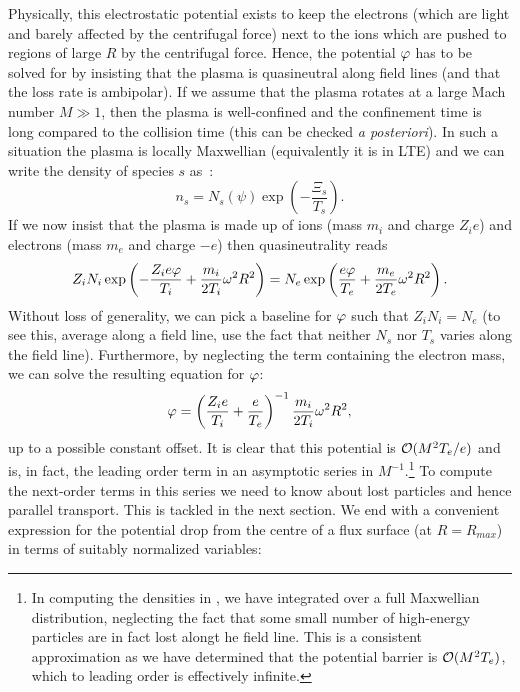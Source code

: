 \documentclass{revtex4}
\begin{document}
Physically, this electrostatic potential exists to keep the electrons (which are light and barely affected by the centrifugal force) next to the ions which are pushed to regions of large $R$ by the centrifugal force.
Hence, the potential $\varphi$ has to be solved for by insisting that the plasma is quasineutral along field lines (and that the loss rate is ambipolar).
If we assume that the plasma rotates at a large Mach number $M \gg 1$, then the plasma is well-confined and the confinement time is long compared to the collision time (this can be checked \textit{a posteriori}). In such a situation the plasma is locally Maxwellian (equivalently it is in LTE) and we can write the density of species $s$ as~\cite{catto:2784,flowtome1}:
\begin{equation}
n_s = N_s(\psi) \exp\left( - \frac{\Xi_s}{T_s} \right).
\label{confinedDensity}
\end{equation}
If we now insist that the plasma is made up of ions (mass $m_i$ and charge $Z_i e$) and electrons (mass $m_e$ and charge $-e$) then quasineutrality reads
\begin{equation}
Z_i N_i \exp\left( - \frac{Z_i e\varphi}{T_i} + \frac{m_i}{2T_i} \omega^2 R^2 \right) = N_e \exp\left( \frac{e\varphi}{T_e} + \frac{m_e}{2T_e} \omega^2 R^2 \right).
\end{equation}
Without loss of generality, we can pick a baseline for $\varphi$ such that $Z_i N_i = N_e$ (to see this, average along a field line, use the fact that neither $N_s$ nor $T_s$ varies along the field line). Furthermore, by neglecting the term containing the electron mass, we can solve the resulting equation for $\varphi$:
\begin{equation}
\varphi = \left( \frac{Z_i e}{T_i} + \frac{e}{T_e}\right)^{-1} \frac{m_i}{2 T_i} \omega^2 R^2,
\end{equation}
up to a possible constant offset. It is clear that this potential is $\mathcal{O}(M^2T_e/e)$ and is, in fact, the leading order term in an asymptotic series in $M^{-1}$.\footnote{In computing the densities in , we have integrated over a full Maxwellian distribution, neglecting the fact that some small number of high-energy particles are in fact lost alongt he field line. This is a consistent approximation as we have determined that the potential barrier is $\mathcal{O}(M^2T_e)$, which to leading order is effectively infinite.} 
To compute the next-order terms in this series we need to know about lost particles and hence parallel transport. This is tackled in the next section. We end with a convenient expression for the potential drop from the centre of a flux surface (at $R = R_{max}$) in terms of suitably normalized variables:
\end{document}
